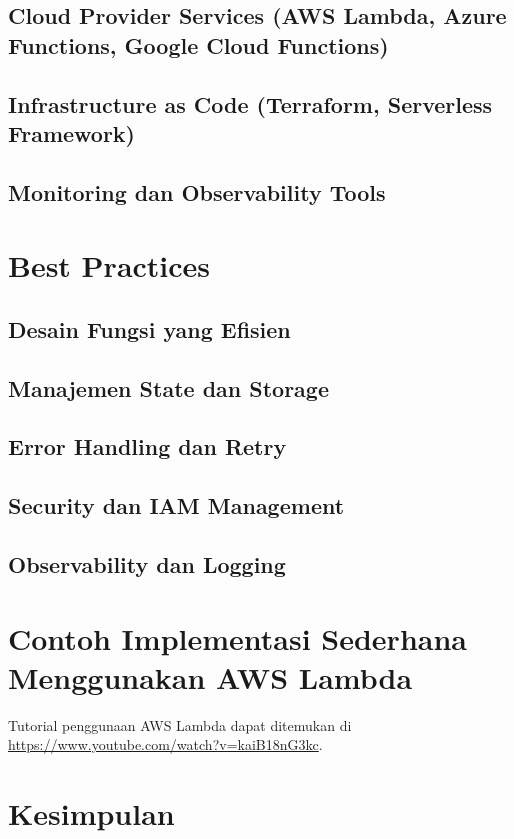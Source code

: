 \subsection{Cloud Provider Services (AWS Lambda, Azure Functions, Google Cloud Functions)}
\subsection{Infrastructure as Code (Terraform, Serverless Framework)}
\subsection{Monitoring dan Observability Tools}

\section{Best Practices}
\subsection{Desain Fungsi yang Efisien}
\subsection{Manajemen State dan Storage}
\subsection{Error Handling dan Retry}
\subsection{Security dan IAM Management}
\subsection{Observability dan Logging}

\section{Contoh Implementasi Sederhana Menggunakan AWS Lambda}

Tutorial penggunaan AWS Lambda dapat ditemukan di \url{https://www.youtube.com/watch?v=kaiB18nG3kc}.


\section{Kesimpulan}
